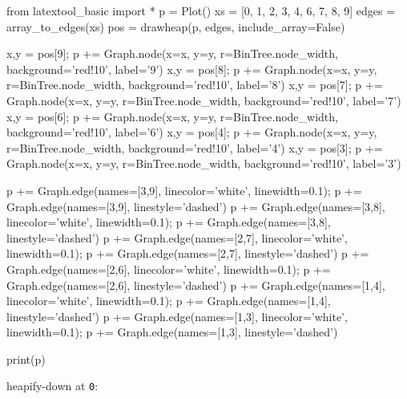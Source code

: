 \begin{python}
from latextool_basic import *
p = Plot()
xs = [0, 1, 2, 3, 4, 6, 7, 8, 9]
edges = array_to_edges(xs)
pos = drawheap(p, edges, include_array=False)

x,y = pos[9]; p += Graph.node(x=x, y=y, r=BinTree.node_width, background='red!10', label='9')
x,y = pos[8]; p += Graph.node(x=x, y=y, r=BinTree.node_width, background='red!10', label='8')
x,y = pos[7]; p += Graph.node(x=x, y=y, r=BinTree.node_width, background='red!10', label='7')
x,y = pos[6]; p += Graph.node(x=x, y=y, r=BinTree.node_width, background='red!10', label='6')
x,y = pos[4]; p += Graph.node(x=x, y=y, r=BinTree.node_width, background='red!10', label='4')
x,y = pos[3]; p += Graph.node(x=x, y=y, r=BinTree.node_width, background='red!10', label='3')

p += Graph.edge(names=[3,9], linecolor='white', linewidth=0.1); p += Graph.edge(names=[3,9], linestyle='dashed')
p += Graph.edge(names=[3,8], linecolor='white', linewidth=0.1); p += Graph.edge(names=[3,8], linestyle='dashed')
p += Graph.edge(names=[2,7], linecolor='white', linewidth=0.1); p += Graph.edge(names=[2,7], linestyle='dashed')
p += Graph.edge(names=[2,6], linecolor='white', linewidth=0.1); p += Graph.edge(names=[2,6], linestyle='dashed')
p += Graph.edge(names=[1,4], linecolor='white', linewidth=0.1); p += Graph.edge(names=[1,4], linestyle='dashed')
p += Graph.edge(names=[1,3], linecolor='white', linewidth=0.1); p += Graph.edge(names=[1,3], linestyle='dashed')

print(p)
\end{python}

heapify-down at \texttt{0}:

